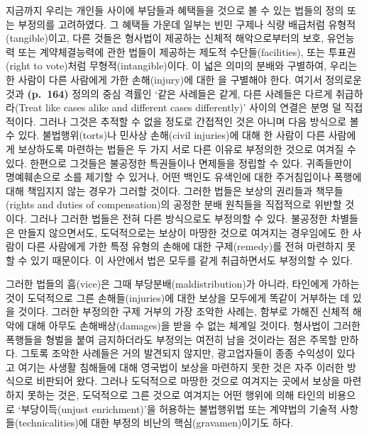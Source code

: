 지금까지 우리는 개인들 사이에 부담들과 혜택들을
 것으로 볼 수 있는 법들의 정의 또는
부정의를 고려하였다. 그 혜택들 가운데 일부는 빈민 구제나 식량 배급처럼
유형적(tangible)이고, 다른 것들은 형사법이 제공하는 신체적
해악으로부터의 보호, 유언능력 또는 계약체결능력에 관한 법들이 제공하는
제도적 수단들(facilities), 또는 투표권(right to vote)처럼
무형적(intangible)이다. 이 넓은 의미의 분배와 구별하여, 우리는 한 사람이
다른 사람에게 가한 손해(injury)에 대한 을
구별해야 한다. 여기서 정의로운 것과 \textbf{(p.~164)} 정의의 중심 격률인
‘같은 사례들은 같게, 다른 사례들은 다르게 취급하라(Treat like cases
alike and different cases differently)’ 사이의 연결은 분명 덜
직접적이다. 그러나 그것은 추적할 수 없을 정도로 간접적인 것은 아니며
다음 방식으로 볼 수 있다. 불법행위(torts)나 민사상 손해(civil
injuries)에 대해 한 사람이 다른 사람에게 보상하도록 마련하는 법들은 두
가지 서로 다른 이유로 부정의한 것으로 여겨질 수 있다. 한편으로 그것들은
불공정한 특권들이나 면제들을 정립할 수 있다. 귀족들만이 명예훼손으로
소를 제기할 수 있거나, 어떤 백인도 유색인에 대한 주거침입이나 폭행에
대해 책임지지 않는 경우가 그러할 것이다. 그러한 법들은 보상의 권리들과
책무들(rights and duties of compensation)의 공정한 분배 원칙들을
직접적으로 위반할 것이다. 그러나 그러한 법들은 전혀 다른 방식으로도
부정의할 수 있다. 불공정한 차별들은 만들지 않으면서도, 도덕적으로는
보상이 마땅한 것으로 여겨지는 경우임에도 한 사람이 다른 사람에게 가한
특정 유형의 손해에 대한 구제(remedy)를 전혀 마련하지 못할 수 있기
때문이다. 이 사안에서 법은 모두를 같게 취급하면서도 부정의할 수 있다.

그러한 법들의 흠(vice)은 그때 부당분배(maldistribution)가 아니라,
타인에게 가하는 것이 도덕적으로 그른 손해들(injuries)에 대한 보상을
모두에게 똑같이 거부하는 데 있을 것이다. 그러한 부정의한 구제 거부의
가장 조악한 사례는, 함부로 가해진 신체적 해악에 대해 아무도
손해배상(damages)을 받을 수 없는 체계일 것이다. 형사법이 그러한 폭행들을
형벌을 붙여 금지하더라도  부정의는 여전히 남을 것이라는 점은
주목할 만하다. 그토록 조악한 사례들은 거의 발견되지 않지만, 광고업자들이
종종 수익성이 있다고 여기는 사생활 침해들에 대해 영국법이 보상을
마련하지 못한 것은 자주 이러한 방식으로 비판되어 왔다. 그러나 도덕적으로
마땅한 것으로 여겨지는 곳에서 보상을 마련하지 못하는 것은, 도덕적으로
그른 것으로 여겨지는 어떤 행위에 의해 타인의 비용으로 ‘부당이득(unjust
enrichment)’을 허용하는 불법행위법 또는 계약법의 기술적
사항들(technicalities)에 대한 부정의 비난의 핵심(gravamen)이기도 하다.

